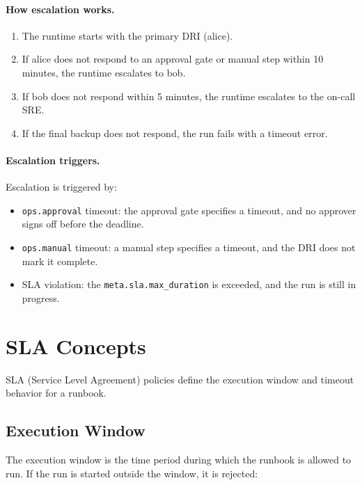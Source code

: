 \paragraph{How escalation works.}
\begin{enumerate}
  \item The runtime starts with the primary DRI (alice).
  \item If alice does not respond to an approval gate or manual step within 10 minutes, the runtime escalates to bob.
  \item If bob does not respond within 5 minutes, the runtime escalates to the on-call SRE.
  \item If the final backup does not respond, the run fails with a timeout error.
\end{enumerate}

\paragraph{Escalation triggers.}
Escalation is triggered by:
\begin{itemize}
  \item \texttt{ops.approval} timeout: the approval gate specifies a timeout, and no approver signs off before the deadline.
  \item \texttt{ops.manual} timeout: a manual step specifies a timeout, and the DRI does not mark it complete.
  \item SLA violation: the \texttt{meta.sla.max\_duration} is exceeded, and the run is still in progress.
\end{itemize}

\section{SLA Concepts}
\label{sec:sla}

SLA (Service Level Agreement) policies define the execution window and timeout behavior for a runbook.

\subsection{Execution Window}

The execution window is the time period during which the runbook is allowed to run. If the run is started outside the window, it is rejected:

